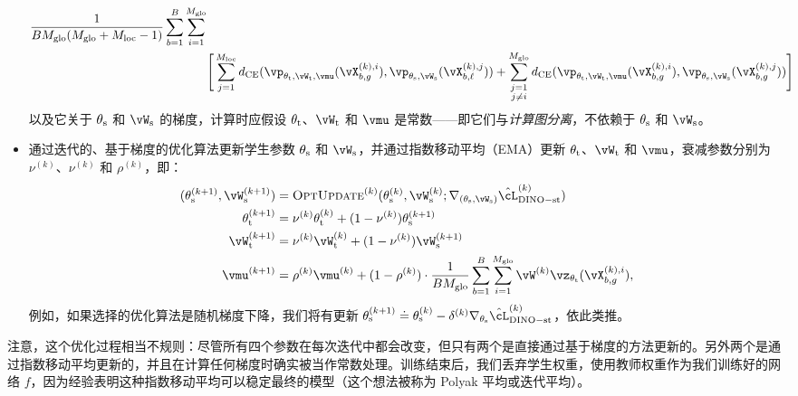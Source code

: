 \documentclass[../../book-main.tex]{subfiles}
\begin{document}
\begin{itemize}
\begin{align}
        \frac{1}{BM_{\glo}(M_{\glo} + M_{\loc} - 1)}\sum_{b = 1}^{B}\sum_{i = 1}^{M_{\glo}}\\
        &\Bigg[\sum_{j = 1}^{M_{\loc}}d_{\CE}(\vp_{\theta_{\teacher}, \vW_{\teacher}, \vmu}(\vX_{b, g}^{(k), i}), \vp_{\theta_{\student}, \vW_{\student}}(\vX_{b, \ell}^{(k), j})) + \sum_{\substack{j = 1 \\ j \neq i}}^{M_{\glo}}d_{\CE}(\vp_{\theta_{\teacher}, \vW_{\teacher}, \vmu}(\vX_{b, g}^{(k), i}), \vp_{\theta_{\student}, \vW_{\student}}(\vX_{b, g}^{(k), j}))\Bigg]\nonumber
    \end{align}
    以及它关于 \(\theta_{\mathrm{s}}\) 和 \(\vW_{\student}\) 的梯度，计算时应假设 \(\theta_{\mathrm{t}}\)、\(\vW_{\teacher}\) 和 \(\vmu\) 是常数——即它们与\textit{计算图分离}，不依赖于 \(\theta_{\mathrm{s}}\) 和 \(\vW_{\student}\)。
    \item 通过迭代的、基于梯度的优化算法更新学生参数 \(\theta_{\mathrm{s}}\) 和 \(\vW_{\student}\)，并通过指数移动平均（EMA）更新 \(\theta_{\mathrm{t}}\)、\(\vW_{\teacher}\) 和 \(\vmu\)，衰减参数分别为 \(\nu^{(k)}\)、\(\nu^{(k)}\) 和 \(\rho^{(k)}\)，即：
    \begin{align}
        (\theta_{\student}^{(k + 1)}, \vW_{\student}^{(k + 1)})
        &= \textsc{OptUpdate}^{(k)}(\theta_{\student}^{(k)}, \vW_{\student}^{(k)}; \nabla_{(\theta_{\student}, \vW_{\student})}\hat{\cL}_{\dino-\student\teacher}^{(k)}) \\
        \theta_{\teacher}^{(k + 1)}
        &= \nu^{(k)}\theta_{\teacher}^{(k)} + (1 - \nu^{(k)})\theta_{\student}^{(k + 1)} \\
        \vW_{\teacher}^{(k + 1)}
        &= \nu^{(k)}\vW_{\teacher}^{(k)} + (1 - \nu^{(k)})\vW_{\student}^{(k + 1)} \\
        \vmu^{(k + 1)}
        &= \rho^{(k)}\vmu^{(k)} + (1 - \rho^{(k)})\cdot\frac{1}{BM_{\glo}}\sum_{b = 1}^{B}\sum_{i = 1}^{M_{\glo}}\vW^{(k)}\vz_{\theta_{\teacher}}(\vX_{b, g}^{(k), i}),
    \end{align}
    例如，如果选择的优化算法是随机梯度下降，我们将有更新 \(\theta_{\student}^{(k + 1)} \doteq \theta_{\student}^{(k)} - \delta^{(k)}\nabla_{\theta_{\student}}\hat{\cL}_{\dino{}-\student\teacher}^{(k)}\)，依此类推。
\end{itemize}
注意，这个优化过程相当不规则：尽管所有四个参数在每次迭代中都会改变，但只有两个是直接通过基于梯度的方法更新的。另外两个是通过指数移动平均更新的，并且在计算任何梯度时确实被当作常数处理。训练结束后，我们丢弃学生权重，使用教师权重作为我们训练好的网络 \(f\)，因为经验表明这种指数移动平均可以稳定最终的模型（这个想法被称为 Polyak 平均或迭代平均）。
\end{document}
